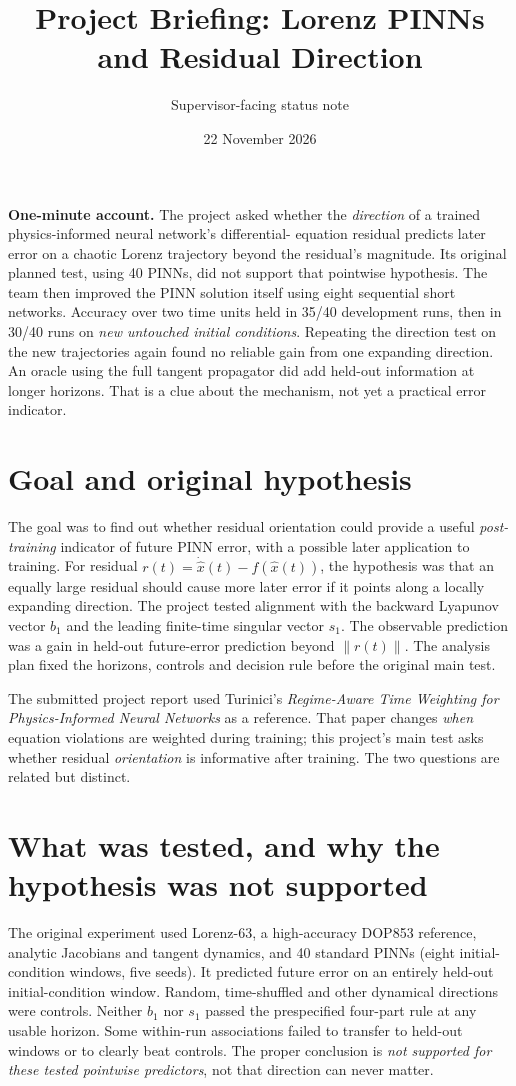 \documentclass[11pt,a4paper]{article}
\title{Project Briefing: Lorenz PINNs and Residual Direction}
\author{Supervisor-facing status note}
\date{22 November 2026}
\begin{document}
\maketitle

\noindent\textbf{One-minute account.} The project asked whether the
\emph{direction} of a trained physics-informed neural network's differential-
equation residual predicts later error on a chaotic Lorenz trajectory beyond
the residual's magnitude. Its original planned test, using 40 PINNs, did not
support that pointwise hypothesis. The team then improved the PINN solution
itself using eight sequential short networks. Accuracy over two time units
held in 35/40 development runs, then in 30/40 runs on \emph{new untouched
initial conditions}. Repeating the direction test on the new trajectories
again found no reliable gain from one expanding direction. An oracle using
the full tangent propagator did add held-out information at longer horizons.
That is a clue about the mechanism, not yet a practical error indicator.

\section*{Goal and original hypothesis}
The goal was to find out whether residual orientation could provide a useful
\emph{post-training} indicator of future PINN error, with a possible later
application to training. For residual
$r(t)=\dot{\widehat{x}}(t)-f(\widehat{x}(t))$, the hypothesis was that an
equally large residual should cause more later error if it points along a
locally expanding direction. The project tested alignment with the backward
Lyapunov vector $b_1$ and the leading finite-time singular vector $s_1$.
The observable prediction was a gain in held-out future-error prediction
beyond $\|r(t)\|$. The analysis plan fixed the horizons, controls and
decision rule before the original main test.

The submitted project report used Turinici's \emph{Regime-Aware Time
Weighting for Physics-Informed Neural Networks} as a reference. That paper
changes \emph{when} equation violations are weighted during training;
this project's main test asks whether residual \emph{orientation} is
informative after training. The two questions are related but distinct.

\section*{What was tested, and why the hypothesis was not supported}
The original experiment used Lorenz-63, a high-accuracy DOP853 reference,
analytic Jacobians and tangent dynamics, and 40 standard PINNs (eight
initial-condition windows, five seeds). It predicted future error on an
entirely held-out initial-condition window. Random, time-shuffled and
other dynamical directions were controls. Neither $b_1$ nor $s_1$ passed
the prespecified four-part rule at any usable horizon. Some within-run
associations failed to transfer to held-out windows or to clearly beat
controls. The proper conclusion is \emph{not supported for these tested
pointwise predictors}, not that direction can never matter.
\end{document}
